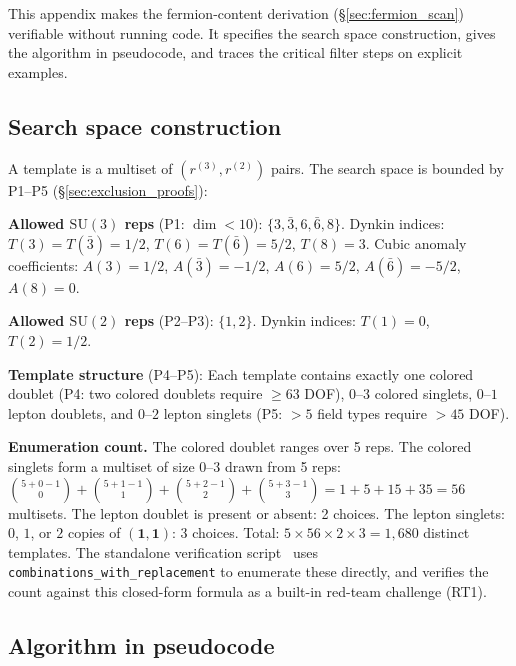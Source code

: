 \documentclass[11pt,a4paper]{article}
\theoremstyle{definition}
\newcommand{\SU}{\mathrm{SU}}
\begin{document}
This appendix makes the fermion-content derivation
(\S\ref{sec:fermion_scan}) verifiable without running code.  It
specifies the search space construction, gives the algorithm in
pseudocode, and traces the critical filter steps on explicit
examples.

\subsection{Search space construction}
\label{app:search_space}

A template is a multiset of $(r^{(3)}, r^{(2)})$ pairs.  The
search space is bounded by P1--P5 (\S\ref{sec:exclusion_proofs}):

\smallskip\noindent\textbf{Allowed $\SU(3)$ reps} (P1: $\dim < 10$):
$\{3, \bar{3}, 6, \bar{6}, 8\}$.
Dynkin indices: $T(3) = T(\bar{3}) = 1/2$, $T(6) = T(\bar{6}) = 5/2$,
$T(8) = 3$.  Cubic anomaly coefficients: $A(3) = 1/2$,
$A(\bar{3}) = -1/2$, $A(6) = 5/2$, $A(\bar{6}) = -5/2$, $A(8) = 0$.

\smallskip\noindent\textbf{Allowed $\SU(2)$ reps} (P2--P3):
$\{1, 2\}$.  Dynkin indices: $T(1) = 0$, $T(2) = 1/2$.

\smallskip\noindent\textbf{Template structure} (P4--P5):
Each template contains exactly one colored doublet (P4: two colored
doublets require $\ge 63$ DOF), $0$--$3$ colored singlets, $0$--$1$
lepton doublets, and $0$--$2$ lepton singlets (P5: $> 5$ field types
require $> 45$ DOF).

\smallskip\noindent\textbf{Enumeration count.}\quad
The colored doublet ranges over 5 reps.  The colored singlets form a
multiset of size $0$--$3$ drawn from 5 reps: $\binom{5+0-1}{0} +
\binom{5+1-1}{1} + \binom{5+2-1}{2} + \binom{5+3-1}{3} = 1 + 5 + 15
+ 35 = 56$ multisets.  The lepton doublet is present or absent: 2
choices.  The lepton singlets: $0$, $1$, or $2$ copies of
$(\mathbf{1},\mathbf{1})$: 3 choices.  Total:
$5 \times 56 \times 2 \times 3 = 1{,}680$ distinct templates.
The standalone verification script~\cite{BrookeFermionScan}
uses \texttt{combinations\_with\_replacement} to enumerate these
directly, and verifies the count against this closed-form formula
as a built-in red-team challenge (RT1).

\subsection{Algorithm in pseudocode}
\label{app:pseudocode}
\end{document}
